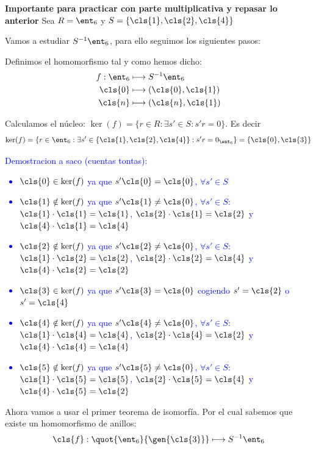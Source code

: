 \begin{example} \textbf{Importante para practicar con parte multiplicativa y repasar lo anterior}
	Sea $R = \ent_6$ y $S=\{ \cls{1}, \cls{2}, \cls{4} \}$
	
	Vamos a estudiar $S^{-1}\ent_6$, para ello seguimos los siguientes pasos:
	
	Definimos el homomorfismo tal y como hemos dicho:
	\begin{align*}
		f: \ent_6 & \longmapsto  S^{-1}\ent_6\\
		\cls{0} & \longmapsto (\cls{0},\cls{1}) \\
		\cls{n} & \longmapsto (\cls{n},\cls{1}) \\
	\end{align*}

Calculamos el núcleo: $\ker(f)=\{ r \in R: \exists s' \in S: s'r=0 \}$. Es decir 
$$\ker(f) = \{ r \in \ent_6: \exists s' \in \{ \cls{1}, \cls{2}, \cls{4} \}: s'r=0_{\ent_6} \} = \{ \cls{0}, \cls{3}\}$$

\textcolor{blue}{Demostracion a saco (cuentas tontas):
	\begin{itemize}
		\item $\cls{0} \in \ker(f)$ ya que $s'\cls{0}=\cls{0}$, $\forall s' \in S$
		\item $\cls{1} \notin \ker(f)$ ya que $s'\cls{1}\neq\cls{0}$, $\forall s' \in S$: $\cls{1}\cdot\cls{1}=\cls{1}$, $\cls{2}\cdot\cls{1}=\cls{2}$ y $\cls{4}\cdot\cls{1}=\cls{4}$
		\item $\cls{2} \notin \ker(f)$ ya que $s'\cls{2}\neq\cls{0}$, $\forall s' \in S$: $\cls{1}\cdot\cls{2}=\cls{2}$, $\cls{2}\cdot\cls{2}=\cls{4}$ y $\cls{4}\cdot\cls{2}=\cls{2}$
		\item $\cls{3} \in \ker(f)$ ya que $s'\cls{3}=\cls{0}$ cogiendo $s'=\cls{2}$ o $s'=\cls{4}$
		\item $\cls{4} \notin \ker(f)$ ya que $s'\cls{4}\neq\cls{0}$, $\forall s' \in S$: $\cls{1}\cdot\cls{4}=\cls{4}$, $\cls{2}\cdot\cls{4}=\cls{2}$ y $\cls{4}\cdot\cls{4}=\cls{4}$
		\item $\cls{5} \notin \ker(f)$ ya que $s'\cls{5}\neq\cls{0}$, $\forall s' \in S$: $\cls{1}\cdot\cls{5}=\cls{5}$, $\cls{2}\cdot\cls{5}=\cls{4}$ y $\cls{4}\cdot\cls{5}=\cls{2}$
	\end{itemize}}
	
	Ahora vamos a usar el primer teorema de isomorfía. Por el cual sabemos que existe un homomorfismo de anillos:
	$$\cls{f}: \quot{\ent_6}{\gen{\cls{3}}} \longmapsto S^{-1}\ent_6$$
	

\end{example}
